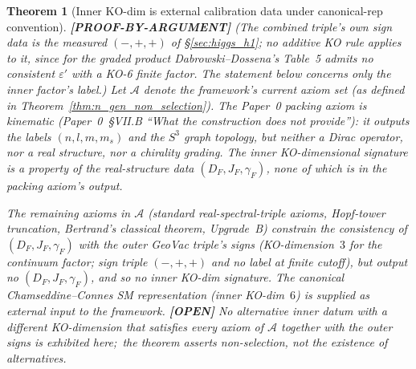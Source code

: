 \documentclass[11pt]{article}
\newtheorem{theorem}{Theorem}
\begin{document}
\begin{theorem}[Inner KO-dim is external calibration data under canonical-rep convention]
\label{thm:ko_dim_non_selection}
\textbf{[PROOF-BY-ARGUMENT]} (The combined triple's own sign data is
the measured $(-,+,+)$ of \S\ref{sec:higgs_h1}; no additive KO rule
applies to it, since for the graded product Dabrowski--Dossena's
Table~5 admits no consistent $\varepsilon'$ with a KO-6 finite factor.
The statement below concerns only the \emph{inner} factor's label.)
Let $\mathcal{A}$ denote the framework's current axiom set
(as defined in \emph{Theorem~\ref{thm:n_gen_non_selection}}).
The Paper~0 packing axiom is kinematic
(Paper~0~\S VII.B ``What the construction does not provide''):  it
outputs the labels $(n, l, m, m_s)$ and the $S^3$ graph topology, but
neither a Dirac operator, nor a real structure, nor a chirality
grading.  The inner KO-dimensional signature is a property of the
real-structure data $(D_F, J_F, \gamma_F)$, none of which is in
the packing axiom's output.

The remaining axioms in $\mathcal{A}$ (standard real-spectral-triple
axioms, Hopf-tower truncation, Bertrand's classical theorem,
Upgrade~B) constrain the consistency of $(D_F, J_F, \gamma_F)$ with
the outer GeoVac triple's signs (KO-dimension~$3$ for the continuum factor; sign triple $(-,+,+)$ and no label at finite cutoff), but output
no $(D_F, J_F, \gamma_F)$, and so no inner KO-dim signature.  The
canonical Chamseddine--Connes SM representation (inner KO-dim~$6$) is
supplied as external input to the framework.  \textbf{[OPEN]} No
alternative inner datum with a different KO-dimension that satisfies
every axiom of $\mathcal{A}$ together with the outer signs is exhibited
here;\ the theorem asserts non-selection, not the existence of
alternatives.
\end{theorem}
\end{document}
